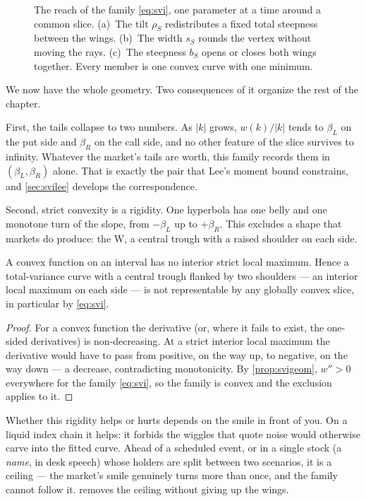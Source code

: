 \begin{figure}[htbp]
\centering
{}
\caption{The reach of the family \eqref{eq:svi}, one parameter at a time
around a common slice.  (a)~The tilt $\rho_S$ redistributes a fixed
total steepness between the wings.  (b)~The width $s_S$ rounds the
vertex without moving the rays.  (c)~The steepness $b_S$ opens or closes
both wings together.  Every member is one convex curve with one
minimum.}
\label{fig:svizoo}
\end{figure}

We now have the whole geometry.  Two consequences of it organize the
rest of the chapter.

First, the tails collapse to two numbers.  As $|k|$ grows, $w(k)/|k|$
tends to $\beta_L$ on the put side and $\beta_R$ on the call side, and
no other feature of the slice survives to infinity.  Whatever the
market's tails are worth, this family records them in
$(\beta_L,\beta_R)$ alone.  That is exactly the pair that Lee's moment
bound constrains, and \cref{sec:svilee} develops the correspondence.

Second, strict convexity is a rigidity.  One hyperbola has one belly and
one monotone turn of the slope, from $-\beta_L$ up to $+\beta_R$.  This
excludes a shape that markets do produce: the W, a central trough with a
raised shoulder on each side.

\begin{proposition}
\label{prop:convexww}
A convex function on an interval has no interior strict local maximum.
Hence a total-variance curve with a central trough flanked by two
shoulders --- an interior local maximum on each side --- is not
representable by any globally convex slice, in particular by
\eqref{eq:svi}.
\end{proposition}

\begin{proof}
For a convex function the derivative (or, where it fails to exist, the
one-sided derivatives) is non-decreasing.  At a strict interior local
maximum the derivative would have to pass from positive, on the way up,
to negative, on the way down --- a decrease, contradicting monotonicity.
By \cref{prop:svigeom}, $w''>0$ everywhere for the family
\eqref{eq:svi}, so the family is convex and the exclusion applies to it.
\end{proof}

Whether this rigidity helps or hurts depends on the smile in front of
you.  On a liquid index chain it helps: it forbids the wiggles that
quote noise would otherwise carve into the fitted curve.  Ahead of a
scheduled event, or in a single stock (a \emph{name}, in desk speech)
whose holders are split between two scenarios, it is a ceiling --- the
market's smile genuinely turns more than once, and the family cannot
follow it.   removes the ceiling without giving up the
wings.
